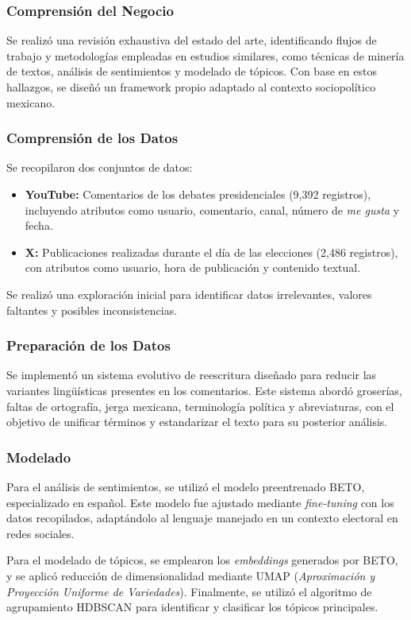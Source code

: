 \documentclass[10pt, a4paper]{article}
\begin{document}
	\subsubsection{Comprensión del Negocio}
	Se realizó una revisión exhaustiva del estado del arte, identificando flujos de trabajo y metodologías empleadas en estudios similares, como técnicas de minería de textos, análisis de sentimientos y modelado de tópicos. Con base en estos hallazgos, se diseñó un framework propio adaptado al contexto sociopolítico mexicano. 
	
	\subsubsection{Comprensión de los Datos}
	Se recopilaron dos conjuntos de datos:
	\begin{itemize}
		\item \textbf{YouTube:} Comentarios de los debates presidenciales (9,392 registros), incluyendo atributos como usuario, comentario, canal, número de \textit{me gusta} y fecha.
		\item \textbf{X:} Publicaciones realizadas durante el día de las elecciones (2,486 registros), con atributos como usuario, hora de publicación y contenido textual.
	\end{itemize}
	Se realizó una exploración inicial para identificar datos irrelevantes, valores faltantes y posibles inconsistencias.
	
	\subsubsection{Preparación de los Datos}
	Se implementó un sistema evolutivo de reescritura diseñado para reducir las variantes lingüísticas presentes en los comentarios. Este sistema abordó groserías, faltas de ortografía, jerga mexicana, terminología política y abreviaturas, con el objetivo de unificar términos y estandarizar el texto para su posterior análisis. 	
	
	\subsubsection{Modelado}
	Para el análisis de sentimientos, se utilizó el modelo preentrenado BETO, especializado en español. Este modelo fue ajustado mediante \textit{fine-tuning} con los datos recopilados, adaptándolo al lenguaje manejado en un contexto electoral en redes sociales. 
	
	Para el modelado de tópicos, se emplearon los \textit{embeddings} generados por BETO, y se aplicó reducción de dimensionalidad mediante UMAP (\textit{Aproximación y Proyección Uniforme de Variedades}). Finalmente, se utilizó el algoritmo de agrupamiento HDBSCAN para identificar y clasificar los tópicos principales.
	
\end{document}
